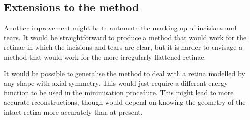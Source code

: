 \documentclass[10pt]{article}
\begin{document}
\subsection*{Extensions to the method}

Another improvement might be to automate the marking up of incisions
and tears. It would be straightforward to produce a method that would
work for the retinae in which the incisions and tears are clear, but
it is harder to envisage a method that would work for the more
irregularly-flattened retinae.

It would be possible to generalise the method to deal with a retina
modelled by any shape with axial symmetry. This would just require a
different energy function to be used in the minimisation
procedure. This might lead to more accurate reconstructions, though
would depend on knowing the geometry of the intact retina more
accurately than at present.






\end{document}
